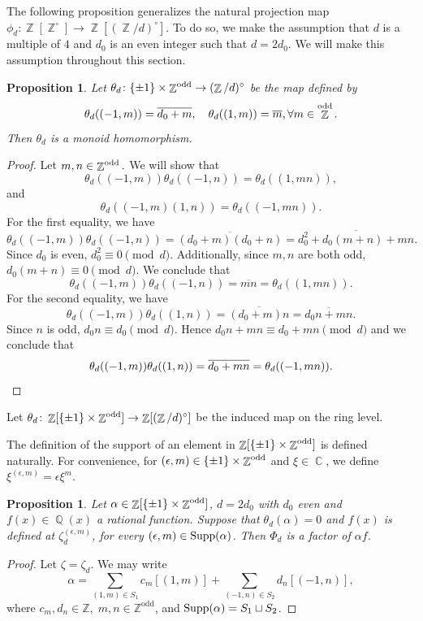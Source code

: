\documentclass[12t,a4paper]{amsart}
\newtheorem{prop}[thm]{Proposition}
\theoremstyle{definition}
\DeclareMathOperator{\C}{\mathbb{C}}
\DeclareMathOperator{\Z}{\mathbb{Z}}
\DeclareMathOperator{\Q}{\mathbb{Q}}
\DeclareMathOperator{\supp}{{\rm Supp}}
\newcommand{\odd}{{\rm odd}}
\numberwithin{equation}{section}
\begin{document}
{The following proposition generalizes the natural projection map $\phi_d\colon \Z[\Z^{\circ}] \to \Z[(\Z/d)^{\circ}].$ To do so, we make the assumption that $d$ is a multiple of $4$ and $d_0$ is an even integer such that $d=2d_0.$ We will make this assumption throughout this section. 
\begin{prop}
\label{prop:0mod-rational_signed}
Let $\theta_d\colon \{\pm 1 \} \times \Z^{\odd} \to (\Z/d)^{\circ} $ be the map defined by
 \[ \theta_d((-1, m))= \overline{d_0+m}, \quad \theta_d((1,m))= \overline{m}, \forall m \in \Z^{\odd}. \]
 Then $\theta_d$ is a monoid homomorphism. 
\end{prop}

\begin{proof}
    Let $m,n \in \Z^{\odd}.$ We will show that 
    \[ \theta_d((-1,m)) \theta_d((-1, n))= \theta_d((1, mn)),\]
    and 
    \[ \theta_d((-1,m)(1, n))= \theta_d((-1, mn)) .\] 
For the first equality, we have 
\[ \theta_d((-1,m)) \theta_d((-1,n))=\overline{(d_0+m)(d_0+n)} = \overline{d_0^2 +d_0(m+n) + mn}.\]
Since $d_0$ is even, $d_0^2 \equiv 0 \pmod{d}.$ Additionally, since $m,n$ are both odd, $d_0(m+n) \equiv 0 \pmod{d}.$ We conclude that
\[ \theta_d((-1,m)) \theta_d((-1,n)) = \overline{mn} = \theta_d((1,mn)). \] 
For the second equality, we have 
\[ \theta_d((-1,m)) \theta_d((1,n))= \overline{(d_0+m)n} = \overline{d_0n +mn}.\]
Since $n$ is odd, $d_0n\equiv d_0\pmod d$. Hence $d_0n+mn\equiv d_0+mn\pmod d$ and we conclude that
\[ \theta_d((-1,m)) \theta_d((1,n)) = \overline{d_0+mn} = \theta_d((-1,mn)).
\qedhere\] 
\end{proof}
Let $\theta_d\colon \Z[\{\pm 1 \} \times \Z^{\odd}] \to \Z[(\Z/d)^{\circ}]$ be the induced map on the ring level. 

The definition of the support of an element in $\Z[\{\pm 1 \} \times \Z^{\odd}]$ is defined naturally. For convenience, for $(\epsilon,m)\in \{\pm 1 \} \times \Z^{\odd}$ and $\xi\in \C$, we define $\xi^{(\epsilon,m)}=\epsilon \xi^m$.  
\begin{prop} \label{prop:0mod-rational_signed}
    Let $\alpha\in  \Z[\{\pm 1 \} \times \Z^{\odd}]$, $d=2d_0$ with $d_0$ even and $f(x)\in \Q(x)$ a rational function. Suppose that $\theta_d(\alpha)=0$ and $f(x)$ is defined at $\zeta_d^{(\epsilon,m)}$, for every $(\epsilon,m) \in \supp(\alpha)$. Then $\Phi_d$ is a factor of $\alpha f$.
\end{prop}
\begin{proof} Let $\zeta=\zeta_d$. We may write
\[
\alpha
= \sum_{(1,m)\in S_1} c_m[(1, m)]  +\sum_{(-1,n)\in S_2} d_n [(-1, n)],
\]
where $c_m, d_n \in \mathbb{Z},\; m, n \in \mathbb{Z}^{\mathrm{odd}}$, and $\supp(\alpha)=S_1\sqcup S_2$. 
  

\end{proof}}
\end{document}
